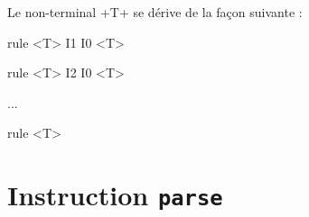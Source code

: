 Le non-terminal \ggs+T+ se dérive de la façon suivante :
\begin{galgascode}
rule <T> { I1 I0 <T> }

rule <T> { I2 I0 <T> }

...

rule <T> {  }
\end{galgascode}







\section{Instruction \texttt{parse}}











